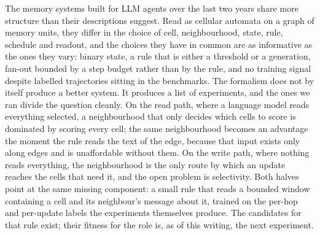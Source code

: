 \documentclass[11pt]{article}
\begin{document}
The memory systems built for LLM agents over the last two years share more structure than their descriptions suggest. Read as cellular automata on a graph of memory units, they differ in the choice of cell, neighbourhood, state, rule, schedule and readout, and the choices they have in common are as informative as the ones they vary: binary state, a rule that is either a threshold or a generation, fan-out bounded by a step budget rather than by the rule, and no training signal despite labelled trajectories sitting in the benchmarks. The formalism does not by itself produce a better system. It produces a list of experiments, and the ones we ran divide the question cleanly. On the read path, where a language model reads everything selected, a neighbourhood that only decides which cells to score is dominated by scoring every cell; the same neighbourhood becomes an advantage the moment the rule reads the text of the edge, because that input exists only along edges and is unaffordable without them. On the write path, where nothing reads everything, the neighbourhood is the only route by which an update reaches the cells that need it, and the open problem is selectivity. Both halves point at the same missing component: a small rule that reads a bounded window containing a cell and its neighbour's message about it, trained on the per-hop and per-update labels the experiments themselves produce. The candidates for that rule exist; their fitness for the role is, as of this writing, the next experiment.
\end{document}
